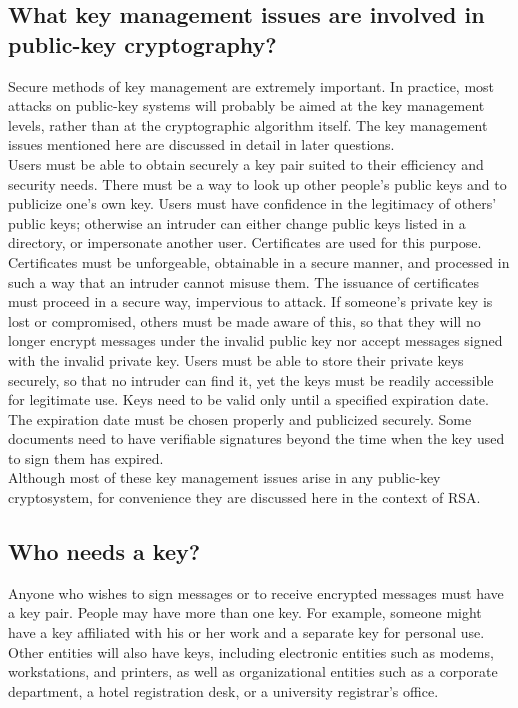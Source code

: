\subsection{What key management issues are involved in public-key
cryptography?}

Secure methods of key management are extremely important. In practice,
most attacks on public-key systems will probably be aimed at the key
management levels, rather than at the cryptographic algorithm itself.
The key management issues mentioned here are discussed in detail in
later questions.\\

Users must be able to obtain securely a key pair suited to their
efficiency and security needs. There must be a way to look up other
people's public keys and to publicize one's own key. Users must have
confidence in the legitimacy of others' public keys; otherwise an
intruder can either change public keys listed in a directory, or
impersonate another user. Certificates are used for this purpose.
Certificates must be unforgeable, obtainable in a secure manner, and
processed in such a way that an intruder cannot misuse them. The
issuance of certificates must proceed in a secure way, impervious to
attack. If someone's private key is lost or compromised, others must be
made aware of this, so that they will no longer encrypt messages under
the invalid public key nor accept messages signed with the invalid
private key. Users must be able to store their private keys securely,
so that no intruder can find it, yet the keys must be readily
accessible for legitimate use. Keys need to be valid only until a
specified expiration date. The expiration date must be chosen properly
and publicized securely. Some documents need to have verifiable
signatures beyond the time when the key used to sign them has expired.\\

Although most of these key management issues arise in any public-key
cryptosystem, for convenience they are discussed here in the context of
RSA.

\subsection{Who needs a key?}

Anyone who wishes to sign messages or to receive encrypted messages
must have a key pair. People may have more than one key. For example,
someone might have a key affiliated with his or her work and a separate
key for personal use. Other entities will also have keys, including
electronic entities such as modems, workstations, and printers, as well
as organizational entities such as a corporate department, a hotel
registration desk, or a university registrar's office.

